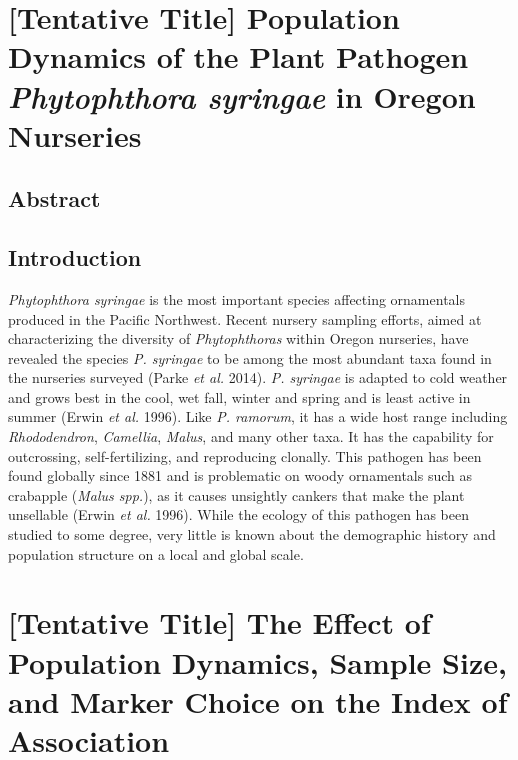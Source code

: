 \documentclass[double,12pt]{beavtex}
\begin{document}
  \chapter{\texorpdfstring{{[}Tentative Title{]} Population Dynamics of
  the Plant Pathogen \emph{Phytophthora syringae} in Oregon
  Nurseries}{{[}Tentative Title{]} Population Dynamics of the Plant Pathogen Phytophthora syringae in Oregon Nurseries}}\label{tentative-title-population-dynamics-of-the-plant-pathogen-phytophthora-syringae-in-oregon-nurseries}
  
  \section{Abstract}\label{abstract-3}
  
  \section{Introduction}\label{introduction-3}
  
  \emph{Phytophthora syringae} is the most important species affecting
  ornamentals produced in the Pacific Northwest. Recent nursery sampling
  efforts, aimed at characterizing the diversity of \emph{Phytophthoras}
  within Oregon nurseries, have revealed the species \emph{P. syringae} to
  be among the most abundant taxa found in the nurseries surveyed (Parke
  \emph{et al.} 2014). \emph{P. syringae} is adapted to cold weather and
  grows best in the cool, wet fall, winter and spring and is least active
  in summer (Erwin \emph{et al.} 1996). Like \emph{P. ramorum}, it has a
  wide host range including \emph{Rhododendron}, \emph{Camellia},
  \emph{Malus}, and many other taxa. It has the capability for
  outcrossing, self-fertilizing, and reproducing clonally. This pathogen
  has been found globally since 1881 and is problematic on woody
  ornamentals such as crabapple (\emph{Malus spp.}), as it causes
  unsightly cankers that make the plant unsellable (Erwin \emph{et al.}
  1996). While the ecology of this pathogen has been studied to some
  degree, very little is known about the demographic history and
  population structure on a local and global scale.
  
  \chapter{{[}Tentative Title{]} The Effect of Population Dynamics, Sample
  Size, and Marker Choice on the Index of
  Association}\label{tentative-title-the-effect-of-population-dynamics-sample-size-and-marker-choice-on-the-index-of-association}
  
\end{document}
